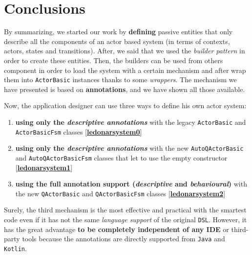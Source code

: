 \section{Conclusions}

By summarizing, we started our work by \textbf{defining} passive entities that only describe all the components of an actor based system (in terms of contexts, actors, states and transitions).
After, we said that we used the \textit{builder pattern} in order to create these entities. Then, the builders can be used from others component in order to load the system with a certain mechanism and after wrap them into \texttt{ActorBasic} instances thanks to some \textit{wrappers}.
The mechanism we have presented is based on \textbf{annotations}, and we have shown all those available.

Now, the application designer can use three ways to define his own actor system:
\begin{enumerate}
	\item \textbf{using only the \textit{descriptive annotations}} with the legacy \texttt{ActorBasic} and \texttt{ActorBasicFsm} classes [\href{https://github.com/LM-96/QA-Extensions/tree/main/it.unibo.ledsonardemo0}{\textcolor{Emerald}{\textbf{ledonarsystem0}}}]
	
	\item \textbf{using only the \textit{descriptive annotations}} with the new \texttt{AutoQActorBasic} and \texttt{AutoQActorBasicFsm} classes that let to use the empty constructor [\href{https://github.com/LM-96/QA-Extensions/tree/main/it.unibo.ledsonardemo1}{\textcolor{Emerald}{\textbf{ledonarsystem1}}}]
	
	\item \textbf{using the full annotation support (\textit{descriptive} and \textit{behavioural})} with the new \texttt{QActorBasic} and \texttt{QActorBasicFsm} classes [\href{https://github.com/LM-96/QA-Extensions/tree/main/it.unibo.ledsonardemo2}{\textcolor{Emerald}{\textbf{ledonarsystem2}}}]
\end{enumerate}

Surely, the third mechanism is the most effective and practical with the smartest code even if it has not the same \textit{language support} of the original \texttt{DSL}. However, it has the great advantage \textbf{to be completely independent of any IDE} or third-party tools because the annotations are directly supported from \texttt{Java} and \texttt{Kotlin}.




